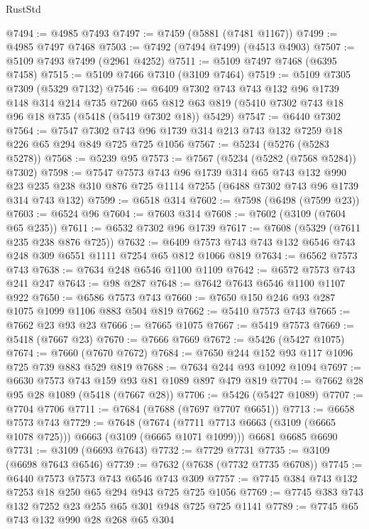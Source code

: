 \begin{lexlean}{RustStd}
\begin{coremodule}
@7494 := @4985 @7493
@7497 := @7459 (@5881 (@7481 @1167))
@7499 := @4985 @7497 @7468
@7503 := @7492 (@7494 @7499) (@4513 @4903)
@7507 := @5109 @7493 @7499 (@2961 @4252)
@7511 := @5109 @7497 @7468 (@6395 @7458)
@7515 := @5109 @7466 @7310 (@3109 @7464)
@7519 := @5109 @7305 @7309 (@5329 @7132)
@7546 := @6409
    @7302
    @743
    @743
    @132
    @96
    @1739
    @148
    @314
    @214
    @735
    @7260
    @65
    @812
    @63
    @819
    (@5410 @7302 @743 @18 @96 @18 @735 (@5418 (@5419 @7302 @18)) @5429)
@7547 := @6440 @7302
@7564 := @7547 @7302 @743 @96 @1739 @314 @213 @743 @132 @7259 @18 @226 @65 @294 @849 @725 @725 @1056
@7567 := @5234 (@5276 (@5283 @5278))
@7568 := @5239 @95
@7573 := @7567 (@5234 (@5282 (@7568 @5284)) @7302)
@7598 := @7547
    @7573
    @743
    @96
    @1739
    @314
    @65
    @743
    @132
    @990
    @23
    @235
    @238
    @310
    @876
    @725
    @1114
    @7255
    (@6488 @7302 @743 @96 @1739 @314 @743 @132)
@7599 := @6518 @314
@7602 := @7598 (@6498 (@7599 @23))
@7603 := @6524 @96
@7604 := @7603 @314
@7608 := @7602 (@3109 (@7604 @65 @235))
@7611 := @6532 @7302 @96 @1739
@7617 := @7608 (@5329 (@7611 @235 @238 @876 @725))
@7632 := @6409 @7573 @743 @743 @132 @6546 @743 @248 @309 @6551 @1111 @7254 @65 @812 @1066 @819
@7634 := @6562 @7573 @743
@7638 := @7634 @248 @6546 @1100 @1109
@7642 := @6572 @7573 @743 @241 @247
@7643 := @98 @287
@7648 := @7642 @7643 @6546 @1100 @1107 @922
@7650 := @6586 @7573 @743
@7660 := @7650 @150 @246 @93 @287 @1075 @1099 @1106 @883 @504 @819
@7662 := @5410 @7573 @743
@7665 := @7662 @23 @93 @23
@7666 := @7665 @1075
@7667 := @5419 @7573
@7669 := @5418 (@7667 @23)
@7670 := @7666 @7669
@7672 := @5426 (@5427 @1075)
@7674 := @7660 (@7670 @7672)
@7684 := @7650 @244 @152 @93 @117 @1096 @725 @739 @883 @529 @819
@7688 := @7634 @244 @93 @1092 @1094
@7697 := @6630 @7573 @743 @159 @93 @81 @1089 @897 @479 @819
@7704 := @7662 @28 @95 @28 @1089 (@5418 (@7667 @28))
@7706 := @5426 (@5427 @1089)
@7707 := @7704 @7706
@7711 := @7684 (@7688 (@7697 @7707 @6651))
@7713 := @6658 @7573 @743
@7729 := @7648
    (@7674 (@7711 @7713 @6663 (@3109 (@6665 @1078 @725))) @6663 (@3109 (@6665 @1071 @1099)))
    @6681
    @6685
    @6690
@7731 := @3109 (@6693 @7643)
@7732 := @7729 @7731
@7735 := @3109 (@6698 @7643 @6546)
@7739 := @7632 (@7638 (@7732 @7735 @6708))
@7745 := @6440 @7573 @7573 @743 @6546 @743 @309
@7757 := @7745 @384 @743 @132 @7253 @18 @250 @65 @294 @943 @725 @725 @1056
@7769 := @7745 @383 @743 @132 @7252 @23 @255 @65 @301 @948 @725 @725 @1141
@7789 := @7745
    @65
    @743
    @132
    @990
    @28
    @268
    @65
    @304

\end{coremodule}
\end{lexlean}
